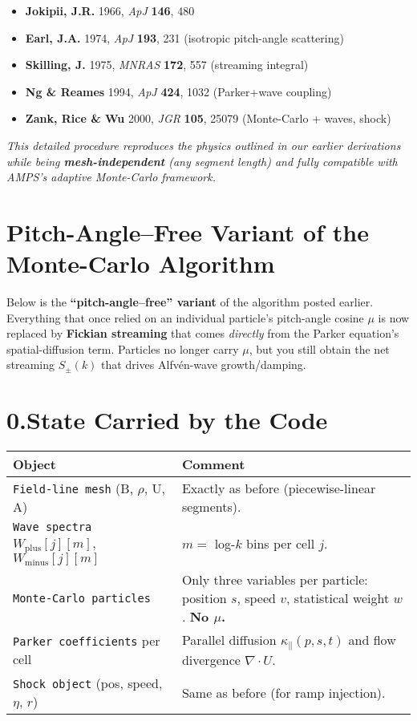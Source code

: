 \begin{itemize}
\item \textbf{Jokipii, J.R.} 1966, \textit{ApJ} \textbf{146}, 480
\item \textbf{Earl, J.A.} 1974, \textit{ApJ} \textbf{193}, 231 (isotropic pitch-angle scattering)
\item \textbf{Skilling, J.} 1975, \textit{MNRAS} \textbf{172}, 557 (streaming integral)
\item \textbf{Ng \& Reames} 1994, \textit{ApJ} \textbf{424}, 1032 (Parker+wave coupling)
\item \textbf{Zank, Rice \& Wu} 2000, \textit{JGR} \textbf{105}, 25079 (Monte-Carlo + waves, shock)
\end{itemize}

\noindent
\textit{This detailed procedure reproduces the physics outlined in our earlier derivations while being \textbf{mesh-independent} (any segment length) and fully compatible with AMPS’s adaptive Monte-Carlo framework.}

\section*{Pitch-Angle--Free Variant of the Monte-Carlo Algorithm}

Below is the \textbf{``pitch-angle--free'' variant} of the algorithm posted earlier. Everything that once relied on an individual particle’s pitch-angle cosine $\mu$ is now replaced by \textbf{Fickian streaming} that comes \textit{directly} from the Parker equation’s spatial-diffusion term. Particles no longer carry $\mu$, but you still obtain the net streaming $S_\pm(k)$ that drives Alfvén-wave growth/damping.

\section*{0.\quad State Carried by the Code}

\begin{tabular}{|l|p{10cm}|}
\hline
\textbf{Object} & \textbf{Comment} \\
\hline
\texttt{Field-line mesh} (B, $\rho$, U, A) & Exactly as before (piecewise-linear segments). \\
\texttt{Wave spectra} $W_{\text{plus}}[j][m]$, $W_{\text{minus}}[j][m]$ & $m =$ log-$k$ bins per cell $j$. \\
\texttt{Monte-Carlo particles} & Only three variables per particle: position $s$, speed $v$, statistical weight $w$. \textbf{No $\mu$.} \\
\texttt{Parker coefficients} per cell & Parallel diffusion $\kappa_\parallel(p,s,t)$ and flow divergence $\nabla \cdot U$. \\
\texttt{Shock object} (pos, speed, $\eta$, $r$) & Same as before (for ramp injection). \\
\hline
\end{tabular}

